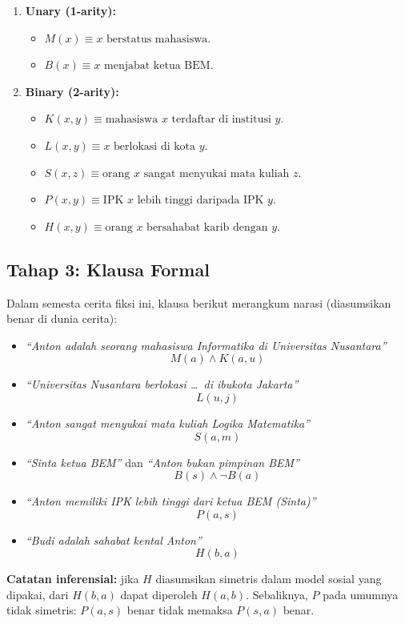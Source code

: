 \begin{enumerate}
    \item \textbf{Unary (1-arity):}
    \begin{itemize}
        \item $M(x) \equiv x \text{ berstatus mahasiswa}$.
        \item $B(x) \equiv x \text{ menjabat ketua BEM}$.
    \end{itemize}
    \item \textbf{Binary (2-arity):}
    \begin{itemize}
        \item $K(x, y) \equiv \text{mahasiswa } x \text{ terdaftar di institusi } y$.
        \item $L(x, y) \equiv x \text{ berlokasi di kota } y$.
        \item $S(x, z) \equiv \text{orang } x \text{ sangat menyukai mata kuliah } z$.
        \item $P(x, y) \equiv \text{IPK } x \text{ lebih tinggi daripada IPK } y$.
        \item $H(x, y) \equiv \text{orang } x \text{ bersahabat karib dengan } y$.
    \end{itemize}
\end{enumerate}

\subsection{Tahap 3: Klausa Formal}

Dalam semesta cerita fiksi ini, klausa berikut merangkum narasi (diasumsikan benar di dunia cerita):

\begin{itemize}
    \item \textit{``Anton adalah seorang mahasiswa Informatika di Universitas Nusantara''}
    \[ M(a) \land K(a, u) \]

    \item \textit{``Universitas Nusantara berlokasi \ldots\ di ibukota Jakarta''}
    \[ L(u, j) \]

    \item \textit{``Anton sangat menyukai mata kuliah Logika Matematika''}
    \[ S(a, m) \]

    \item \textit{``Sinta ketua BEM''} dan \textit{``Anton bukan pimpinan BEM''}
    \[ B(s) \land \neg B(a) \]

    \item \textit{``Anton memiliki IPK lebih tinggi dari ketua BEM (Sinta)''}
    \[ P(a, s) \]

    \item \textit{``Budi adalah sahabat kental Anton''}
    \[ H(b, a) \]
\end{itemize}

\textbf{Catatan inferensial:} jika $H$ diasumsikan simetris dalam model sosial yang dipakai, dari $H(b,a)$ dapat diperoleh $H(a,b)$. Sebaliknya, $P$ pada umumnya tidak simetris: $P(a,s)$ benar tidak memaksa $P(s,a)$ benar.
